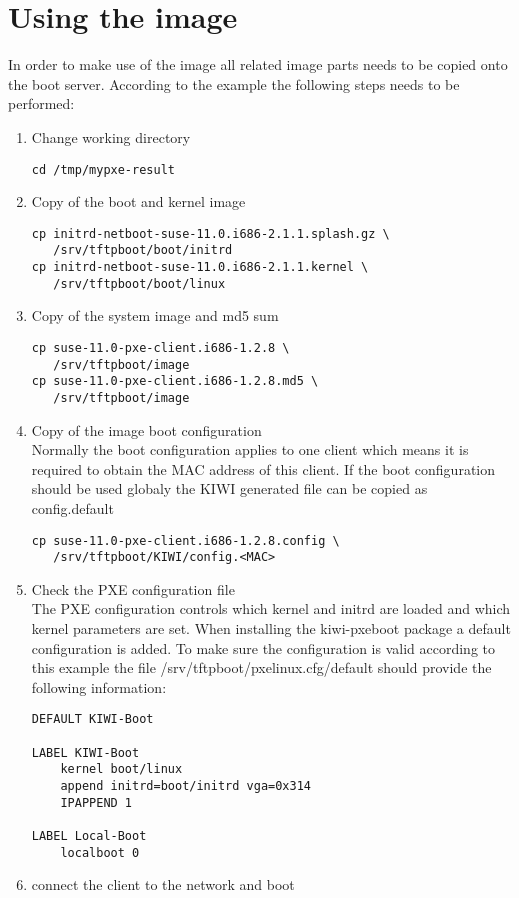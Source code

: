 \section{Using the image}

In order to make use of the image all related image parts needs 
to be copied onto the boot server. According to the example the following
steps needs to be performed:

\begin{enumerate}
\item Change working directory
\begin{verbatim}
cd /tmp/mypxe-result
\end{verbatim}
\item Copy of the boot and kernel image
\begin{verbatim}
cp initrd-netboot-suse-11.0.i686-2.1.1.splash.gz \
   /srv/tftpboot/boot/initrd
cp initrd-netboot-suse-11.0.i686-2.1.1.kernel \
   /srv/tftpboot/boot/linux
\end{verbatim}
\item Copy of the system image and md5 sum
\begin{verbatim}
cp suse-11.0-pxe-client.i686-1.2.8 \
   /srv/tftpboot/image
cp suse-11.0-pxe-client.i686-1.2.8.md5 \
   /srv/tftpboot/image
\end{verbatim}
\item Copy of the image boot configuration\\
      Normally the boot configuration applies to one client which
      means it is required to obtain the MAC address of this client.
      If the boot configuration should be used globaly the KIWI
      generated file can be copied as config.default
\begin{verbatim}
cp suse-11.0-pxe-client.i686-1.2.8.config \
   /srv/tftpboot/KIWI/config.<MAC>
\end{verbatim}
\item Check the PXE configuration file\\
      The PXE configuration controls which kernel and initrd are
      loaded and which kernel parameters are set. When installing
      the kiwi-pxeboot package a default configuration is added.
      To make sure the configuration is valid according to this
      example the file /srv/tftpboot/pxelinux.cfg/default should
      provide the following information:
\begin{verbatim}
DEFAULT KIWI-Boot

LABEL KIWI-Boot
    kernel boot/linux
    append initrd=boot/initrd vga=0x314
    IPAPPEND 1

LABEL Local-Boot
    localboot 0
\end{verbatim}
\item connect the client to the network and boot
\end{enumerate}

